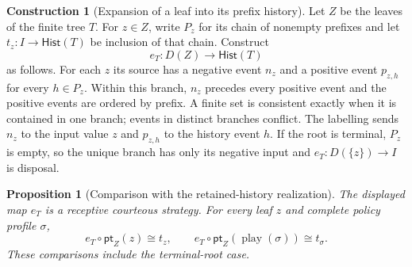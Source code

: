 \documentclass[11pt,a4paper]{article}
\numberwithin{equation}{section}
\newtheorem{proposition}[theorem]{Proposition}
\theoremstyle{definition}
\newtheorem{construction}[construction]{Construction}
\theoremstyle{remark}
\theoremstyle{plain}
\begin{document}
\begin{construction}[Expansion of a leaf into its prefix history]
\label{con:egt-history-expansion}
Let $Z$ be the leaves of the finite tree $T$. For $z\in Z$, write $P_z$
for its chain of nonempty prefixes and let
$t_z:I\to\mathsf{Hist}(T)$ be inclusion of that chain.
Construct
\[
 e_T:D(Z)\longrightarrow\mathsf{Hist}(T)
\]
as follows. For each $z$ its source has a negative event $n_z$ and a
positive event $p_{z,h}$ for every $h\in P_z$. Within this branch,
$n_z$ precedes every positive event and the positive events are ordered
by prefix. A finite set is consistent exactly when it is contained in
one branch; events in distinct branches conflict. The labelling sends
$n_z$ to the input value $z$ and $p_{z,h}$ to the history event $h$.
If the root is terminal, $P_z$ is empty, so the unique branch has only
its negative input and $e_T:D(\{z\})\to I$ is disposal.
\end{construction}

\begin{proposition}[Comparison with the retained-history realization]
\label{prop:egt-history-expansion}
The displayed map $e_T$ is a receptive courteous strategy. For every leaf
$z$ and complete policy profile $\sigma$,
\[
 e_T\circ\mathsf{pt}_Z(z)\cong t_z,
 \qquad
 e_T\circ\mathsf{pt}_Z(\operatorname{play}(\sigma))
       \cong t_\sigma.
\]
These comparisons include the terminal-root case.
\end{proposition}
\end{document}
